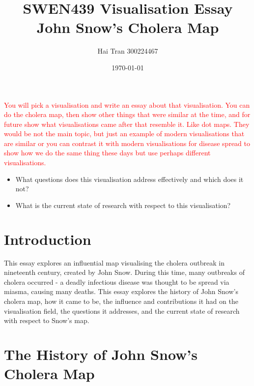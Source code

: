 \documentclass[12pt]{article}
\title{SWEN439 Visualisation Essay \\ John Snow's Cholera Map}
\author{Hai Tran 300224467}
\date{\today}
\begin{document}
\maketitle 

\begin{abstract}

\end{abstract}
\textcolor{red}{
You will pick a visualisation and write an essay about that visualisation. 
You can do the cholera map, then show other things that were similar at the time, and for future show what visualisations came after that resemble it. Like dot maps. They would be not the main topic, but just an example of modern visualisations that are similar or you can contrast it with modern visualisations for disease spread to show how we do the same thing these days but use perhaps different visualisations.
}

\begin{itemize}
\item What questions does this visualisation address effectively and which does it not?
\item What is the current state of research with respect to this visualisation?
\end{itemize}

\section{Introduction}

This essay explores an influential map visualising the cholera outbreak in nineteenth century, created by John Snow. During this time, many outbreaks of cholera occurred - a deadly infectious disease was thought to be spread via miasma, causing many deaths. This essay explores the history of John Snow's cholera map, how it came to be, the influence and contributions it had on the visualisation field, the questions it addresses, and the current state of research with respect to Snow's map. 

\section{The History of John Snow's Cholera Map}
\end{document}
